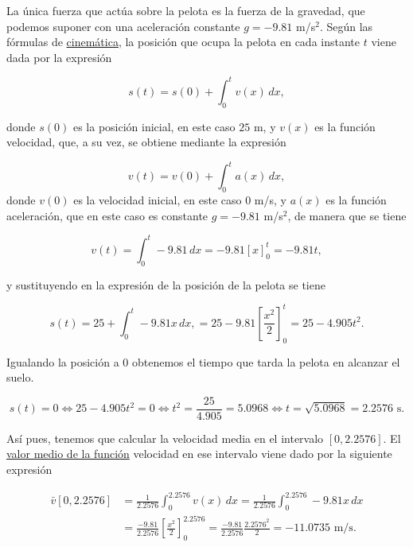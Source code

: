 \documentclass[
  spanish,
  a4paper,
]{scrreport}
\theoremstyle{definition}
\theoremstyle{remark}
\begin{document}
\begin{tcolorbox}[enhanced jigsaw, arc=.35mm, bottomrule=.15mm, bottomtitle=1mm, breakable, colback=white, colbacktitle=quarto-callout-tip-color!10!white, colframe=quarto-callout-tip-color-frame, coltitle=black, left=2mm, leftrule=.75mm, opacityback=0, opacitybacktitle=0.6, rightrule=.15mm, title=\textcolor{quarto-callout-tip-color}{\faLightbulb}\hspace{0.5em}{Solución}, titlerule=0mm, toprule=.15mm, toptitle=1mm]

La única fuerza que actúa sobre la pelota es la fuerza de la gravedad,
que podemos suponer con una aceleración constante \(g=-9.81\) m/s\(^2\).
Según las fórmulas de
\href{https://aprendeconalf.es/analisis-manual/08-integrales.html\#cinem\%C3\%A1tica}{cinemática},
la posición que ocupa la pelota en cada instante \(t\) viene dada por la
expresión

\[
s(t) = s(0) + \int_0^t v(x)\,dx,
\]

donde \(s(0)\) es la posición inicial, en este caso \(25\) m, y \(v(x)\)
es la función velocidad, que, a su vez, se obtiene mediante la expresión

\[
v(t) = v(0) + \int_0^t a(x)\,dx,
\] donde \(v(0)\) es la velocidad inicial, en este caso \(0\) m/s, y
\(a(x)\) es la función aceleración, que en este caso es constante
\(g=-9.81\) m/s\(^2\), de manera que se tiene

\[
v(t) = \int_0^t -9.81 \,dx 
= -9.81[x]_0^t 
= -9.81t,
\]

y sustituyendo en la expresión de la posición de la pelota se tiene

\[
s(t) = 25 + \int_0^t -9.81x\,dx,
= 25 - 9.81 \left[\frac{x^2}{2}\right]_0^t
= 25 - 4.905 t^2.
\]

Igualando la posición a \(0\) obtenemos el tiempo que tarda la pelota en
alcanzar el suelo.

\[
s(t) = 0 
\Leftrightarrow 25 - 4.905 t^2 = 0 
\Leftrightarrow t^2 = \frac{25}{4.905} = 5.0968
\Leftrightarrow t = \sqrt{5.0968} = 2.2576 \mbox{ s}.
\]

Así pues, tenemos que calcular la velocidad media en el intervalo
\([0, 2.2576]\). El
\href{https://aprendeconalf.es/analisis-manual/08-integrales.html\#c\%C3\%A1lculo-de-la-media-de-una-funci\%C3\%B3n}{valor
medio de la función} velocidad en ese intervalo viene dado por la
siguiente expresión

\begin{align*}
\bar v[0,2.2576] 
&= \frac{1}{2.2576} \int_0^{2.2576} v(x)\, dx 
= \frac{1}{2.2576} \int_0^{2.2576} -9.81 x\, dx \\
&= \frac{-9.81}{2.2576} \left[\frac{x^2}{2}\right]_0^{2.2576}
= \frac{-9.81}{2.2576}\frac{2.2576^2}{2}
= -11.0735 \mbox{ m/s}.
\end{align*}

\end{tcolorbox}
\end{document}
